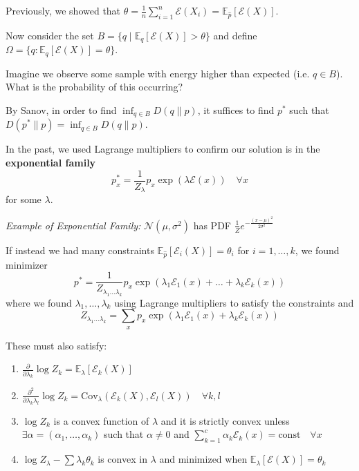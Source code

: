 \documentclass[12pt]{report}
\renewcommand{\hat}[1]{\widehat{#1}}
\newcommand{\E}{\mathbb{E}}
\newcommand{\Ec}{\mathcal{E}}
\newcommand*{\tbf}[1]{\ifmmode\mathbf{#1}\else\textbf{#1}\fi}
\begin{document}
Previously, we showed that $\theta = \frac{1}{n} \sum_{i=1}^{n} \Ec(X_i) = \E_{\hat p} [\Ec(X)]$.

Now consider the set $B = \{q \; | \; \E_q [\Ec(X)] > \theta\}$ and define $\Omega = \{q: \E_q [\Ec(X)] = \theta\}$.

\begin{center}
\end{center}
Imagine we observe some sample with energy higher than expected (i.e. $q \in B$). What is the probability of this occurring?

By Sanov, in order to find $\inf_{q \in B} D(q \parallel p)$, it suffices to find $p^*$ such that $D(p^* \parallel p) = \inf_{q \in B} D(q \parallel p)$.

In the past, we used Lagrange multipliers to confirm our solution is in the \tbf{exponential family}
\[p_x^* = \frac{1}{Z_{\lambda}} p_x \exp(\lambda \Ec(x)) \quad \forall x\]
for some $\lambda$.

\emph{Example of Exponential Family:} $\mathcal{N}(\mu, \sigma^2)$ has PDF $\frac{1}{Z} e^{-\frac{(x- \mu)^2}{2\sigma^2}}$

If instead we had many constraints $\E_{\hat p} [\Ec_i(X)] = \theta_i$ for $i = 1, \dots, k$, we found minimizer
\[p^* = \frac{1}{Z_{\lambda_1 \dots \lambda_k}} p_x \exp(\lambda_1 \Ec_1(x) + \dots + \lambda_k \Ec_k(x))\]
where we found $\lambda_1, \dots, \lambda_k$ using Lagrange multipliers to satisfy the constraints and
\[Z_{\lambda_1\dots \lambda_k} = \sum_x p_x \exp(\lambda_1 \Ec_1(x) + \lambda_k \Ec_k(x))\]

These must also satisfy:
\begin{enumerate}
	\item $\frac{\partial}{\partial \lambda_k} \log Z_k = \E_{\lambda}[\Ec_k(X)]$
	\item $\frac{\partial^2}{\partial \lambda_k \lambda_l} \log Z_k = \text{Cov}_{\lambda}(\Ec_k(X), \Ec_l(X)) \quad \forall k, l$
	\item $\log Z_k$ is a convex function of $\lambda$ and it is strictly convex unless $\exists \alpha = (\alpha_1, \dots, \alpha_k)$ such that $\alpha \neq 0$ and $\sum_{k=1}^c \alpha_k \Ec_k(x) = \text{const} \quad \forall x$
	\item $\log Z_{\lambda} - \sum \lambda_k \theta_k$ is convex in $\lambda$ and minimized when $\E_{\lambda}[\Ec(X)] =\theta_k$
\end{enumerate}
\end{document}
